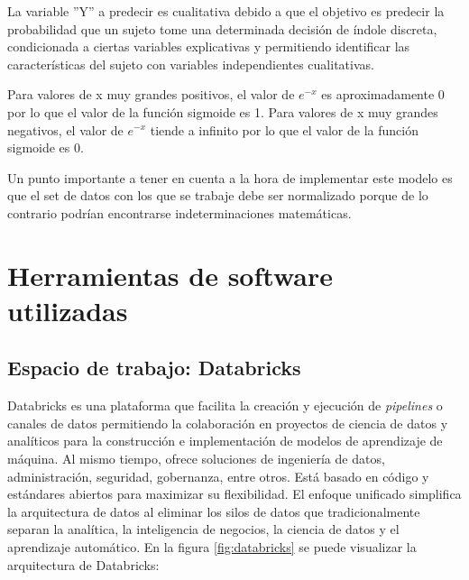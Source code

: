 La variable ''Y'' a predecir es cualitativa debido a que el objetivo es predecir la probabilidad que un sujeto tome una determinada decisión de índole discreta, condicionada a ciertas variables explicativas y permitiendo identificar las características del sujeto con variables independientes cualitativas.


Para valores de x muy grandes positivos, el valor de $e^{-x}$ es aproximadamente 0 por lo que el valor de la función sigmoide es 1. Para valores de x muy grandes negativos, el valor de $e^{-x}$ tiende a infinito por lo que el valor de la función sigmoide es 0. 

Un punto importante a tener en cuenta a la hora de implementar este modelo es que el set de datos con los que se trabaje debe ser normalizado porque de lo contrario podrían encontrarse indeterminaciones matemáticas.

\section{Herramientas de software utilizadas}
\subsection{Espacio de trabajo: Databricks}
Databricks es una plataforma que facilita la creación y ejecución de \textit{pipelines} o canales de datos permitiendo la colaboración en proyectos de ciencia de datos y analíticos para la construcción e implementación de modelos de aprendizaje de máquina.
Al mismo tiempo, ofrece soluciones de ingeniería de datos, administración, seguridad, gobernanza, entre otros. Está basado en código y estándares abiertos para maximizar su flexibilidad. El enfoque unificado simplifica la arquitectura de datos al eliminar los silos de datos que tradicionalmente separan la analítica, la inteligencia de negocios, la ciencia de datos y el aprendizaje automático.
En la figura  \ref{fig:databricks} se puede visualizar la arquitectura de Databricks:

